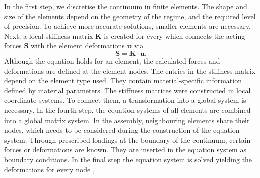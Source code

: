 In the first step, we discretise the continuum in finite elements. The shape and size of the elements depend on the geometry of the regime, and the required level of precision. To achieve more accurate solutions, smaller elements are necessary. Next, a local stiffness matrix $\boldsymbol{K}$ is created for every which connects the acting forces $\boldsymbol{S}$ with the element deformations $\boldsymbol{u}$ via 
\begin{equation}
    \boldsymbol{S} =  \boldsymbol{K} \cdot \boldsymbol{u}.
\end{equation}
Although the equation holds for an element, the calculated forces and deformations are defined at the element nodes. The entries in the stiffness matrix depend on the  element type used. They contain material-specific information defined by material parameters. The stiffness matrices were constructed in local coordinate systems. To connect them, a transformation into a global system is necessary. In the fourth step, the equation systems of all elements are combined into a global matrix system. In the assembly, neighbouring elements share their nodes, which needs to be considered during the construction of the equation system. Through prescribed loadings at the boundary of the continuum, certain forces or deformations are known. They are inserted in the equation system as boundary conditions. In the final step the equation system is solved yielding the deformations for every node \cite{willner_vorlesungsskript_nodate}, \cite{jagota_finite_nodate}. 

